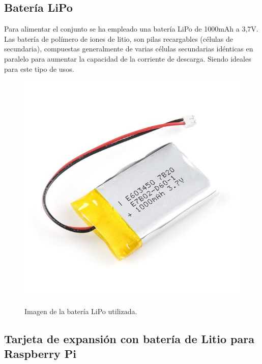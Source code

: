 \subsection{ Batería LiPo }

Para alimentar el conjunto se ha empleado una batería LiPo de 1000mAh a 3,7V. Las batería de polímero de iones de litio, son pilas recargables (células de secundaria), compuestas generalmente de varias células secundarias idénticas en paralelo para aumentar la capacidad 
de la corriente de descarga. Siendo ideales para este tipo de usos.

\begin{figure}[H]
  \begin{center}
    \includegraphics[scale=0.3]{imagenes/robot/bateria-lipo.jpg}\\
    \caption{Imagen de la batería LiPo utilizada.}
  \end{center}
\end{figure}


\subsection{ Tarjeta de expansión con batería de Litio para Raspberry Pi }

